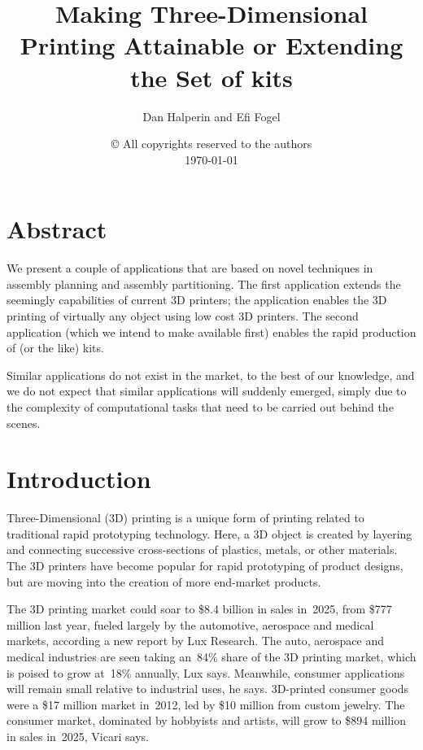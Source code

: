 \documentclass{article}
\begin{document}
\title{Making Three-Dimensional Printing Attainable or Extending the
  Set of \lego{} kits}
\author{Dan Halperin and Efi Fogel}
\date{\copyright{} All copyrights reserved to the authors\\\today}
\maketitle
\section{Abstract}
\label{sec:abstract}
We present a couple of applications that are based on novel techniques
in assembly planning and assembly partitioning. The first application
extends the seemingly capabilities of current 3D printers; the
application enables the 3D printing of virtually any object using low
cost 3D printers. The second application (which we intend to make
available first) enables the rapid production of \lego{} (or the like)
kits.

Similar applications do not exist in the market, to the best of our
knowledge, and we do not expect that similar applications will
suddenly emerged, simply due to the complexity of computational 
tasks that need to be carried out behind the scenes.

\section{Introduction}
\label{sec:introduction}
Three-Dimensional (3D) printing is a unique form of printing
related to traditional rapid prototyping technology. Here, a 3D
object is created by layering and connecting successive cross-sections
of plastics, metals, or other materials. The 3D printers have become
popular for rapid prototyping of product designs, but are moving into
the creation of more end-market products.

The 3D printing market could soar to \$8.4 billion in sales in~2025,
from \$777 million last year, fueled largely by the automotive,
aerospace and medical markets, according a new report by Lux
Research. The auto, aerospace and medical industries are seen taking
an~84\% share of the 3D printing market, which is poised to grow
at~18\% annually, Lux says. Meanwhile, consumer applications will
remain small relative to industrial uses, he says. 3D-printed consumer
goods were a \$17 million market in~2012, led by \$10 million from
custom jewelry. The consumer market, dominated by hobbyists and
artists, will grow to \$894 million in sales in~2025, Vicari says.
\end{document}
